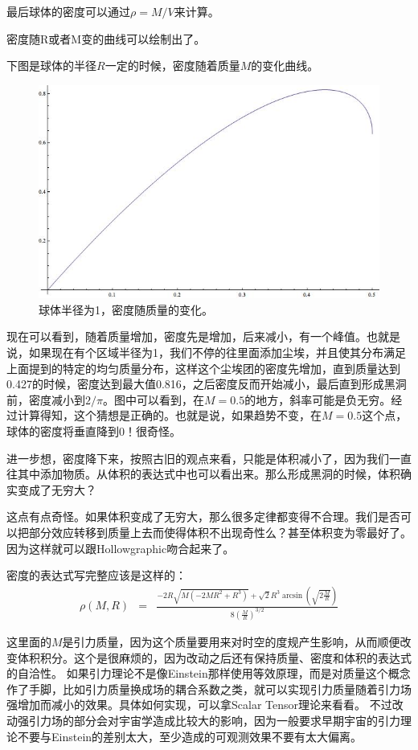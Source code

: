 \documentclass[12pt,a4paper]{article}
\begin{document}
最后球体的密度可以通过$\rho=M/V$来计算。

密度随R或者M变的曲线可以绘制出了。


下图是球体的半径$R$一定的时候，密度随着质量$M$的变化曲线。
\begin{figure}[!htbp]
\centering
\includegraphics[width=400pt]{DustBlackHole_FixR.jpg}
\caption{球体半径为1，密度随质量的变化。}\label{fig:FixR}
\end{figure}

现在可以看到，随着质量增加，密度先是增加，后来减小，有一个峰值。也就是说，如果现在有个区域半径为1，我们不停的往里面添加尘埃，并且使其分布满足上面提到的特定的均匀质量分布，这样这个尘埃团的密度先增加，直到质量达到0.427的时候，密度达到最大值0.816，之后密度反而开始减小，最后直到形成黑洞前，密度减小到$2/\pi$。图中可以看到，在$M=0.5$的地方，斜率可能是负无穷。经过计算得知，这个猜想是正确的。也就是说，如果趋势不变，在$M=0.5$这个点，球体的密度将垂直降到0！很奇怪。

进一步想，密度降下来，按照古旧的观点来看，只能是体积减小了，因为我们一直往其中添加物质。从体积的表达式中也可以看出来。那么形成黑洞的时候，体积确实变成了无穷大？

这点有点奇怪。如果体积变成了无穷大，那么很多定律都变得不合理。我们是否可以把部分效应转移到质量上去而使得体积不出现奇性么？甚至体积变为零最好了。因为这样就可以跟Hollowgraphic吻合起来了。

密度的表达式写完整应该是这样的：
\begin{eqnarray}
\rho(M,R)&=&\frac{-2 R\sqrt{M(-2M R^2+R^3)}+\sqrt 2 R^3 \arcsin (\sqrt{2 \frac{M}{R}})}{8 (\frac{M}{R})^{3/2}}\label{eqn:densityMR}
\end{eqnarray}

这里面的\(M\)是引力质量，因为这个质量要用来对时空的度规产生影响，从而顺便改变体积积分。这个是很麻烦的，因为改动之后还有保持质量、密度和体积的表达式的自洽性。
如果引力理论不是像Einstein那样使用等效原理，而是对质量这个概念作了手脚，比如引力质量换成场的耦合系数之类，就可以实现引力质量随着引力场强增加而减小的效果。具体如何实现，可以拿Scalar Tensor理论来看看。
不过改动强引力场的部分会对宇宙学造成比较大的影响，因为一般要求早期宇宙的引力理论不要与Einstein的差别太大，至少造成的可观测效果不要有太大偏离。
\end{document}
